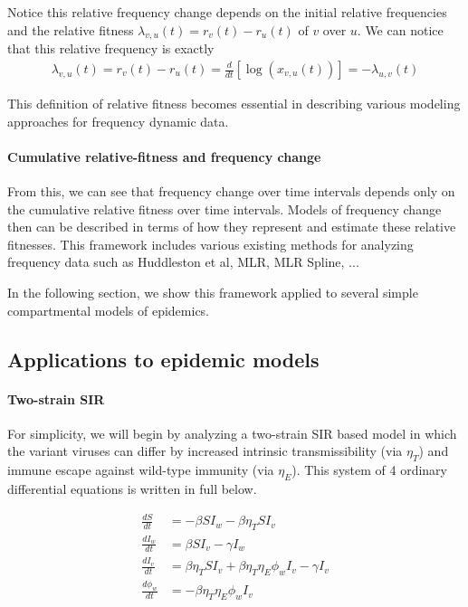\documentclass[12pt,oneside,letterpaper]{article}
\begin{document}
Notice this relative frequency change depends on the initial relative frequencies and the relative fitness $\lambda_{v,u}(t) = r_{v}(t) - r_{u}(t)$ of $v$ over $u$.
We can notice that this relative frequency is exactly
\begin{align}
\lambda_{v, u}(t) = r_{v}(t) - r_{u}(t) = \frac{d }{d t} \left[\log \left( x_{v,u}(t) \right) \right] = - \lambda_{u,v}(t)
\end{align}

This definition of relative fitness becomes essential in describing various modeling approaches for frequency dynamic data.

\paragraph{Cumulative relative-fitness and frequency change}

From this, we can see that frequency change over time intervals depends only on the cumulative relative fitness over time intervals.
Models of frequency change then can be described in terms of how they represent and estimate these relative fitnesses.
This framework includes various existing methods for analyzing frequency data such as Huddleston et al, MLR, MLR Spline, ...

In the following section, we show this framework applied to several simple compartmental models of epidemics.

\subsection*{Applications to epidemic models}

\paragraph{Two-strain SIR}%

For simplicity, we will begin by analyzing a two-strain SIR based model in which the variant viruses can differ by increased intrinsic transmissibility (via $\eta_{T}$) and immune escape against wild-type immunity (via $\eta_{E}$).
This system of 4 ordinary differential equations is written in full below.

\begin{align*}
    \frac{d S}{d t} &= - \beta S I_{w} - \beta \eta_{T} S I_{v}\\ 
    \frac{d I_{w}}{dt} &= \beta S I_{v} - \gamma I_{w}\\
    \frac{d I_{v}}{dt} &= \beta \eta_{T} S I_{v} + \beta \eta_{T} \eta_{E} \phi_{w} I_{v} - \gamma I_{v}\\
    \frac{d \phi_{w}}{dt} &= - \beta \eta_{T} \eta_{E} \phi_{w} I_{v}
\end{align*}
\end{document}
